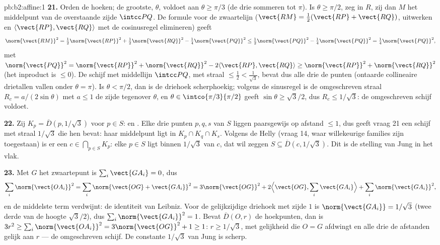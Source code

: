\begin{solution}{pb:b2:affine:1}
\textbf{21.} Orden de hoeken; de grootste, $\theta$, voldoet aan
$\theta \geq \pi/3$ (de drie sommeren tot $\pi$). Is $\theta \geq
\pi/2$, zeg in $R$, zij dan $M$ het middelpunt van de overstaande
zijde $\intcc PQ$. De formule voor de zwaartelijn ($\vect{RM} =
\tfrac12(\vect{RP} + \vect{RQ})$, uitwerken en $\langle\vect{RP},
\vect{RQ}\rangle$ met de cosinusregel elimineren) geeft
\[
\norm{\vect{RM}}^2 = \tfrac12\norm{\vect{RP}}^2 +
\tfrac12\norm{\vect{RQ}}^2 - \tfrac14\norm{\vect{PQ}}^2 \leq
\tfrac12\norm{\vect{PQ}}^2 - \tfrac14\norm{\vect{PQ}}^2 =
\tfrac14\norm{\vect{PQ}}^2,
\]
met $\norm{\vect{PQ}}^2 = \norm{\vect{RP}}^2 + \norm{\vect{RQ}}^2 -
2\langle\vect{RP}, \vect{RQ}\rangle \geq \norm{\vect{RP}}^2 +
\norm{\vect{RQ}}^2$ (het inproduct is $\leq 0$). De schijf met
middellijn $\intcc PQ$, met straal $\leq \tfrac12 <
\tfrac1{\sqrt3}$, bevat dus alle drie de punten (ontaarde
collineaire drietallen vallen onder $\theta = \pi$). Is $\theta <
\pi/2$, dan is de driehoek scherphoekig; volgens de sinusregel is
de omgeschreven straal $R_c = a/(2\sin\theta)$ met $a \leq 1$ de
zijde tegenover $\theta$, en $\theta \in \intco{\pi/3}{\pi/2}$
geeft $\sin\theta \geq \sqrt3/2$, dus $R_c \leq 1/\sqrt3$: de
omgeschreven schijf voldoet.

\textbf{22.} Zij $K_p = \overline D(p, 1/\sqrt3)$ voor $p \in S$:
 en . Elke drie punten $p, q, s$ van $S$ liggen
paarsgewijs op afstand $\leq 1$, dus geeft vraag 21 een schijf met
straal $1/\sqrt3$ die hen bevat: haar middelpunt ligt in $K_p \cap
K_q \cap K_s$. Volgens de  Helly (vraag 14, waar
willekeurige families zijn toegestaan) is er een $c \in
\bigcap_{p\in S}K_p$: elke $p \in S$ ligt binnen $1/\sqrt3$ van
$c$, dat wil zeggen $S \subseteq \overline D(c, 1/\sqrt3)$. Dit is
de stelling van Jung in het vlak.

\textbf{23.} Met $G$ het zwaartepunt is $\sum_i\vect{GA_i} = 0$,
dus
\[
\sum_i\norm{\vect{OA_i}}^2 = \sum_i\norm{\vect{OG} +
\vect{GA_i}}^2 = 3\norm{\vect{OG}}^2 + 2\Bigl\langle
\vect{OG}, \sum_i\vect{GA_i}\Bigr\rangle +
\sum_i\norm{\vect{GA_i}}^2,
\]
en de middelste term verdwijnt: de identiteit van Leibniz. Voor de
gelijkzijdige driehoek met zijde $1$ is $\norm{\vect{GA_i}} =
1/\sqrt3$ (twee derde van de hoogte $\sqrt3/2$), dus
$\sum_i\norm{\vect{GA_i}}^2 = 1$. Bevat $\overline D(O, r)$ de
hoekpunten, dan is $3r^2 \geq \sum_i\norm{\vect{OA_i}}^2 =
3\norm{\vect{OG}}^2 + 1 \geq 1$: $r \geq 1/\sqrt3$, met gelijkheid
die $O = G$ afdwingt en alle drie de afstanden gelijk aan $r$ ---
de omgeschreven schijf. De constante $1/\sqrt3$ van Jung is scherp.


\end{solution}

